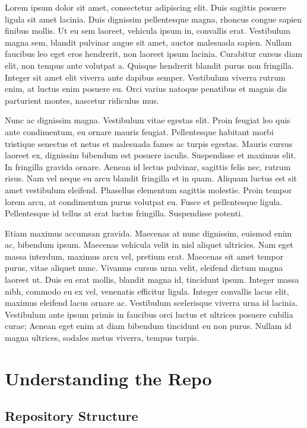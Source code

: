 \documentclass[
  letterpaper,
  DIV=11,
  numbers=noendperiod]{scrreprt}
\begin{document}
Lorem ipsum dolor sit amet, consectetur adipiscing elit. Duis sagittis
posuere ligula sit amet lacinia. Duis dignissim pellentesque magna,
rhoncus congue sapien finibus mollis. Ut eu sem laoreet, vehicula ipsum
in, convallis erat. Vestibulum magna sem, blandit pulvinar augue sit
amet, auctor malesuada sapien. Nullam faucibus leo eget eros hendrerit,
non laoreet ipsum lacinia. Curabitur cursus diam elit, non tempus ante
volutpat a. Quisque hendrerit blandit purus non fringilla. Integer sit
amet elit viverra ante dapibus semper. Vestibulum viverra rutrum enim,
at luctus enim posuere eu. Orci varius natoque penatibus et magnis dis
parturient montes, nascetur ridiculus mus.

Nunc ac dignissim magna. Vestibulum vitae egestas elit. Proin feugiat
leo quis ante condimentum, eu ornare mauris feugiat. Pellentesque
habitant morbi tristique senectus et netus et malesuada fames ac turpis
egestas. Mauris cursus laoreet ex, dignissim bibendum est posuere
iaculis. Suspendisse et maximus elit. In fringilla gravida ornare.
Aenean id lectus pulvinar, sagittis felis nec, rutrum risus. Nam vel
neque eu arcu blandit fringilla et in quam. Aliquam luctus est sit amet
vestibulum eleifend. Phasellus elementum sagittis molestie. Proin tempor
lorem arcu, at condimentum purus volutpat eu. Fusce et pellentesque
ligula. Pellentesque id tellus at erat luctus fringilla. Suspendisse
potenti.

Etiam maximus accumsan gravida. Maecenas at nunc dignissim, euismod enim
ac, bibendum ipsum. Maecenas vehicula velit in nisl aliquet ultricies.
Nam eget massa interdum, maximus arcu vel, pretium erat. Maecenas sit
amet tempor purus, vitae aliquet nunc. Vivamus cursus urna velit,
eleifend dictum magna laoreet ut. Duis eu erat mollis, blandit magna id,
tincidunt ipsum. Integer massa nibh, commodo eu ex vel, venenatis
efficitur ligula. Integer convallis lacus elit, maximus eleifend lacus
ornare ac. Vestibulum scelerisque viverra urna id lacinia. Vestibulum
ante ipsum primis in faucibus orci luctus et ultrices posuere cubilia
curae; Aenean eget enim at diam bibendum tincidunt eu non purus. Nullam
id magna ultrices, sodales metus viverra, tempus turpis.

\part{Understanding the Repo}

\chapter{Repository Structure}\label{repository-structure}
\end{document}
